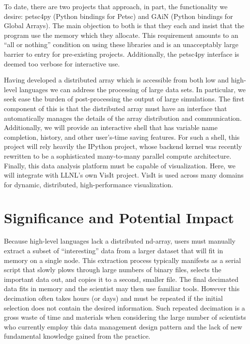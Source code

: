 \documentclass[letterpaper,11pt]{article}
\begin{document}
To date, there are two projects that approach, in part, the functionality we desire: 
petsc4py\cite{petsc4py-web-page} (Python bindings for Petsc\cite{petsc-user-ref}) 
and GAiN\cite{global-arrays-python} (Python bindings for Global Arrays\cite{global-arrays}).  
The main objection to both is that they each and insist that the program use the 
memory which they allocate.  This requirement amounts to an ``all or nothing'' condition
on using these libraries and is an unacceptably large barrier to entry for pre-existing 
projects.  Additionally, the petsc4py interface is deemed too verbose for interactive use.


Having developed a distributed array which is accessible from both low and high-level 
languages we can address the processing of large data sets.  In particular, we seek 
ease the burden of post-processing the output of large simulations. 
The first component of this is that the distributed array must have an interface that 
automatically manages the details of the array distribution and communication.  
Additionally, we will provide an interactive shell that has variable name completion, 
history, and other user's-time saving features.  For such a shell, this project will 
rely heavily the IPython project, whose backend kernel was recently rewritten to be a 
sophisticated many-to-many parallel compute architecture.  Finally, this data analysis 
platform must be capable of visualization.  Here, we will integrate with LLNL's own VisIt 
project.  VisIt is used across many domains for dynamic, distributed, 
high-performance visualization.


\section*{Significance and Potential Impact}

Because high-level languages lack a distributed nd-array, users must manually extract a subset
 of ``interesting'' data from a larger dataset that will fit in memory on a single node.  This extraction process typically manifests 
as a serial script that slowly plows through large numbers of binary files, selects the 
important data out, and copies it to a second, smaller file.  The final decimated data fits 
in memory and the scientist may then use familiar tools.   However this decimation often takes 
hours (or days) and must be repeated if the initial selection does not contain the desired 
information.  Such repeated decimation is a gross waste of time and materials when considering 
the large number of scientists who currently employ this data management design pattern and
the lack of new fundamental knowledge gained from the practice.
\end{document}
